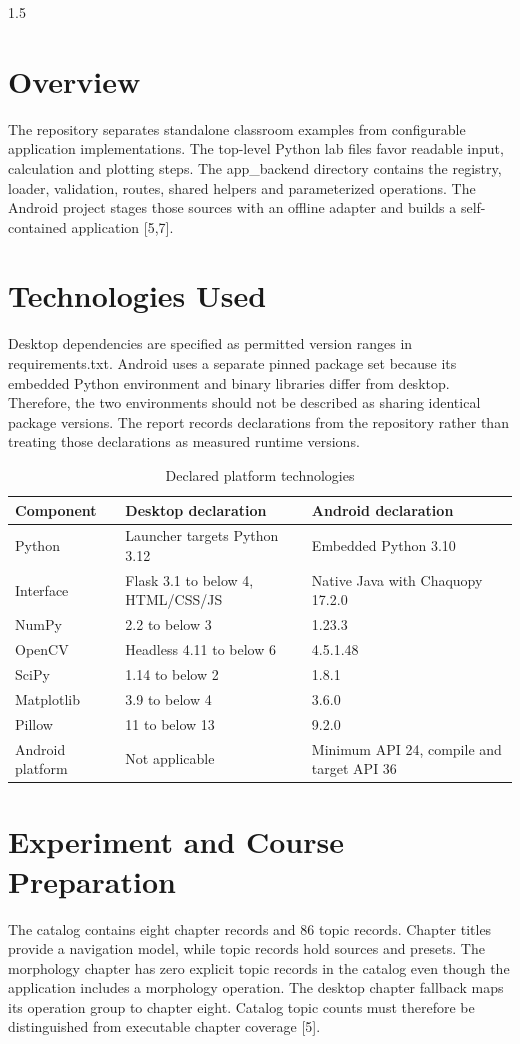 \begin{spacing}{1.5}
\section{Overview}
The repository separates standalone classroom examples from configurable application implementations. The top-level Python lab files favor readable input, calculation and plotting steps. The app\_backend directory contains the registry, loader, validation, routes, shared helpers and parameterized operations. The Android project stages those sources with an offline adapter and builds a self-contained application [5,7].

\section{Technologies Used}
Desktop dependencies are specified as permitted version ranges in requirements.txt. Android uses a separate pinned package set because its embedded Python environment and binary libraries differ from desktop. Therefore, the two environments should not be described as sharing identical package versions. The report records declarations from the repository rather than treating those declarations as measured runtime versions.

\begin{table}[htbp]\centering\small
\caption{Declared platform technologies}
\begin{tabularx}{\textwidth}{XXX}
\toprule
\textbf{Component} & \textbf{Desktop declaration} & \textbf{Android declaration}\\\midrule
Python & Launcher targets Python 3.12 & Embedded Python 3.10\\
Interface & Flask 3.1 to below 4, HTML/CSS/JS & Native Java with Chaquopy 17.2.0\\
NumPy & 2.2 to below 3 & 1.23.3\\
OpenCV & Headless 4.11 to below 6 & 4.5.1.48\\
SciPy & 1.14 to below 2 & 1.8.1\\
Matplotlib & 3.9 to below 4 & 3.6.0\\
Pillow & 11 to below 13 & 9.2.0\\
Android platform & Not applicable & Minimum API 24, compile and target API 36\\
\bottomrule\end{tabularx}\end{table}
\section{Experiment and Course Preparation}
The catalog contains eight chapter records and 86 topic records. Chapter titles provide a navigation model, while topic records hold sources and presets. The morphology chapter has zero explicit topic records in the catalog even though the application includes a morphology operation. The desktop chapter fallback maps its operation group to chapter eight. Catalog topic counts must therefore be distinguished from executable chapter coverage [5].


\end{spacing}
